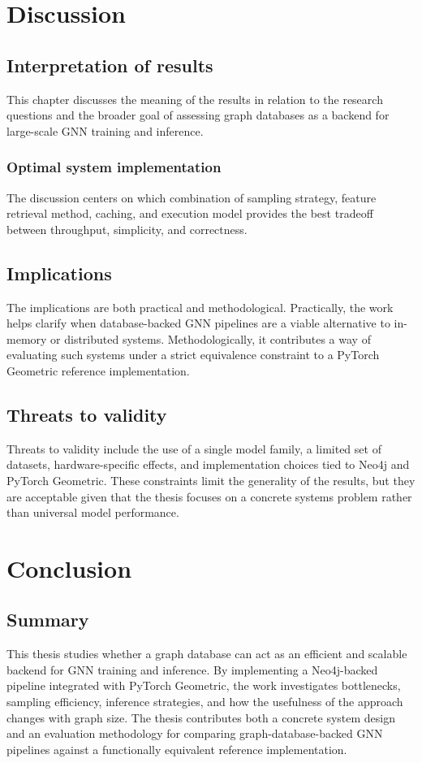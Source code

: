 \documentclass[PhD]{uclathes}
\begin{document}
\chapter{Discussion}

\section{Interpretation of results}
This chapter discusses the meaning of the results in relation to the research
questions and the broader goal of assessing graph databases as a backend for
large-scale GNN training and inference.

\subsection{Optimal system implementation}
The discussion centers on which combination of sampling strategy, feature
retrieval method, caching, and execution model provides the best tradeoff
between throughput, simplicity, and correctness.

\section{Implications}
The implications are both practical and methodological. Practically, the work
helps clarify when database-backed GNN pipelines are a viable alternative to
in-memory or distributed systems. Methodologically, it contributes a way of
evaluating such systems under a strict equivalence constraint to a PyTorch
Geometric reference implementation.

\section{Threats to validity}
Threats to validity include the use of a single model family, a limited set of
datasets, hardware-specific effects, and implementation choices tied to Neo4j
and PyTorch Geometric. These constraints limit the generality of the results,
but they are acceptable given that the thesis focuses on a concrete systems
problem rather than universal model performance.

\chapter{Conclusion}

\section{Summary}
This thesis studies whether a graph database can act as an efficient and
scalable backend for GNN training and inference. By implementing a Neo4j-backed
pipeline integrated with PyTorch Geometric, the work investigates bottlenecks,
sampling efficiency, inference strategies, and how the usefulness of the
approach changes with graph size. The thesis contributes both a concrete system
design and an evaluation methodology for comparing graph-database-backed GNN
pipelines against a functionally equivalent reference implementation.
\end{document}
